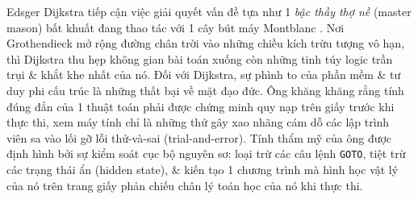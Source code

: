 \documentclass[11pt]{article}
\begin{document}
Edsger Dijkstra tiếp cận việc giải quyết vấn đề tựa như 1 \emph{bậc thầy thợ nề} (master mason) bất khuất đang thao tác với 1 cây bút máy Montblanc \cite{dijkstra1976discipline}. Nơi Grothendieck mở rộng đường chân trời vào những chiều kích trừu tượng vô hạn, thì Dijkstra thu hẹp không gian bài toán xuống còn những tinh túy logic trần trụi \& khắt khe nhất của nó. Đối với Dijkstra, sự phình to của phần mềm \& tư duy phi cấu trúc là những thất bại về mặt đạo đức. Ông khăng khăng rằng tính đúng đắn của 1 thuật toán phải được chứng minh quy nạp trên giấy trước khi thực thi, xem máy tính chỉ là những thứ gây xao nhãng cám dỗ các lập trình viên sa vào lối gỡ lỗi thử-và-sai (trial-and-error). Tính thẩm mỹ của ông được định hình bởi sự kiểm soát cục bộ nguyên sơ: loại trừ các câu lệnh \texttt{GOTO}, tiệt trừ các trạng thái ẩn (hidden state), \& kiến tạo 1 chương trình mà hình học vật lý của nó trên trang giấy phản chiếu chân lý toán học của nó khi thực thi.
\end{document}
